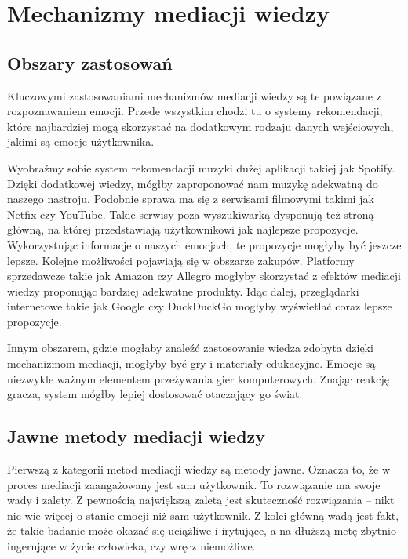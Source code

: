 \chapter{Mechanizmy mediacji wiedzy}
\label{cha:mechanizmyMediacjiWiedzy}


\section{Obszary zastosowań}
\label{sec:obszaryZastosowan}

Kluczowymi zastosowaniami mechanizmów mediacji wiedzy są te powiązane z rozpoznawaniem emocji. Przede wszystkim chodzi tu o systemy rekomendacji, które najbardziej mogą skorzystać na dodatkowym rodzaju danych wejściowych, jakimi są emocje użytkownika. 

Wyobraźmy sobie system rekomendacji muzyki dużej aplikacji takiej jak Spotify. Dzięki dodatkowej wiedzy, mógłby zaproponować nam muzykę adekwatną do naszego nastroju. Podobnie sprawa ma się z serwisami filmowymi takimi jak Netfix czy YouTube. Takie serwisy poza wyszukiwarką dysponują też stroną główną, na której przedstawiają użytkownikowi jak najlepsze propozycje. Wykorzystując informacje o naszych emocjach, te propozycje mogłyby być jeszcze lepsze. Kolejne możliwości pojawiają się w obszarze zakupów. Platformy sprzedawcze takie jak Amazon czy Allegro mogłyby skorzystać z efektów mediacji wiedzy proponując bardziej adekwatne produkty. Idąc dalej, przeglądarki internetowe takie jak Google czy DuckDuckGo mogłyby wyświetlać coraz lepsze propozycje.

Innym obszarem, gdzie mogłaby znaleźć zastosowanie wiedza zdobyta dzięki mechanizmom mediacji, mogłyby być gry i materiały edukacyjne. Emocje są niezwykle ważnym elementem przeżywania gier komputerowych. Znając reakcję gracza, system mógłby lepiej dostosować otaczający go świat.


\section{Jawne metody mediacji wiedzy}
\label{sec:jawneMetodyMediacjiWiedzy}

Pierwszą z kategorii metod mediacji wiedzy są metody jawne. Oznacza to, że w proces mediacji zaangażowany jest sam użytkownik. To rozwiązanie ma swoje wady i zalety. Z pewnością największą zaletą jest skuteczność rozwiązania -- nikt nie wie więcej o stanie emocji niż sam użytkownik. Z kolei główną wadą jest fakt, że takie badanie może okazać się uciążliwe i irytujące, a na dłuższą metę zbytnio ingerujące w życie człowieka, czy wręcz niemożliwe.

